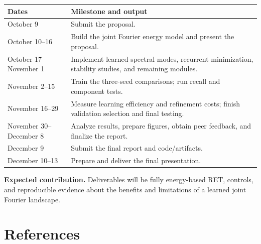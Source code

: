 \documentclass[11pt,letterpaper]{article}
\begin{document}
\smallskip\begin{tabularx}{\textwidth}{@{}p{3.2cm}X@{}}\toprule
\textbf{Dates} & \textbf{Milestone and output}\\\midrule
October 9 & Submit the proposal.\\
October 10–16 & Build the joint Fourier energy model and present the proposal.\\
October 17–November 1 & Implement learned spectral modes, recurrent minimization, stability studies, and remaining modules.\\
November 2–15 & Train the three-seed comparisons; run recall and component tests.\\
November 16–29 & Measure learning efficiency and refinement costs; finish validation selection and final testing.\\
November 30–December 8 & Analyze results, prepare figures, obtain peer feedback, and finalize the report.\\
December 9 & Submit the final report and code/artifacts.\\
December 10–13 & Prepare and deliver the final presentation.\\
\bottomrule\end{tabularx}\smallskip

\textbf{Expected contribution.} Deliverables will be fully energy-based RET, controls, and reproducible evidence about the benefits and limitations of a learned joint Fourier landscape.

\newpage
\section*{References}
\end{document}
